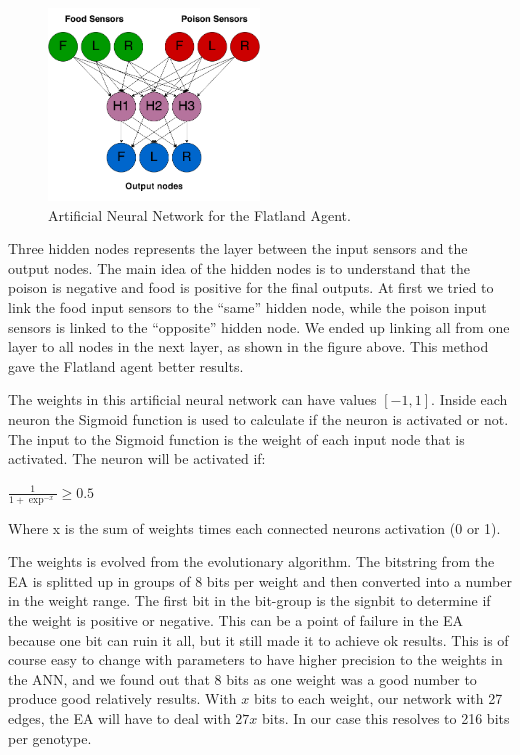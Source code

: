 \begin{figure}[h]
  \centering
    \includegraphics[width=0.5\textwidth]{img/Flatland_network}
    \caption{Artificial Neural Network for the Flatland Agent.}
\end{figure}

Three hidden nodes represents the layer between the input sensors and the output nodes. The main idea of the hidden nodes is to understand that the poison is negative and food is positive for the final outputs. At first we tried to link the food input sensors to the ``same'' hidden node, while the poison input sensors is linked to the ``opposite'' hidden node. We ended up linking all from one layer to all nodes in the next layer, as shown in the figure above. This method gave the Flatland agent better results.

The weights in this artificial neural network can have values $[-1, 1]$. Inside each neuron the Sigmoid function is used to calculate if the neuron is activated or not. The input to the Sigmoid function is the weight of each input node that is activated. The neuron will be activated if:

\begin{center}
	$\frac{1}{1 + \exp^{-x}} \geq 0.5$
\end{center}

Where x is the sum of weights times each connected neurons activation (0 or 1).

The weights is evolved from the evolutionary algorithm. The bitstring from the EA is splitted up in groups of 8 bits per weight and then converted into a number in the weight range. The first bit in the bit-group is the signbit to determine if the weight is positive or negative. This can be a point of failure in the EA because one bit can ruin it all, but it still made it to achieve ok results. This is of course easy to change with parameters to have higher precision to the weights in the ANN, and we found out that 8 bits as one weight was a good number to produce good relatively results. With $x$ bits to each weight, our network with 27 edges, the EA will have to deal with $27x$ bits. In our case this resolves to 216 bits per genotype.

